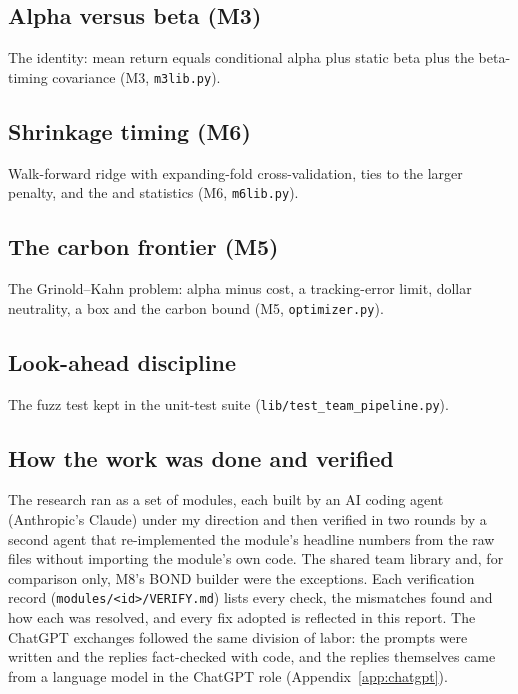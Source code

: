 \subsection{Alpha versus beta (M3)}
The \citet{ln2006} identity: mean return equals conditional alpha plus static beta plus the beta-timing covariance (M3, \texttt{m3lib.py}).


\subsection{Shrinkage timing (M6)}
Walk-forward ridge with expanding-fold cross-validation, ties to the larger penalty, and the \citet{ct2008} and \citet{cw2007} statistics (M6, \texttt{m6lib.py}).



\subsection{The carbon frontier (M5)}
The Grinold--Kahn problem: alpha minus cost, a tracking-error limit, dollar neutrality, a box and the carbon bound (M5, \texttt{optimizer.py}).


\subsection{Look-ahead discipline}
The fuzz test kept in the unit-test suite (\texttt{lib/test\_team\_pipeline.py}).


\subsection{How the work was done and verified}
The research ran as a set of modules, each built by an AI coding agent (Anthropic's Claude) under my direction and then verified in two rounds by a second agent that re-implemented the module's headline numbers from the raw files without importing the module's own code. The shared team library and, for comparison only, M8's BOND builder were the exceptions. Each verification record (\texttt{modules/<id>/VERIFY.md}) lists every check, the mismatches found and how each was resolved, and every fix adopted is reflected in this report. The ChatGPT exchanges followed the same division of labor: the prompts were written and the replies fact-checked with code, and the replies themselves came from a language model in the ChatGPT role (Appendix~\ref{app:chatgpt}).

